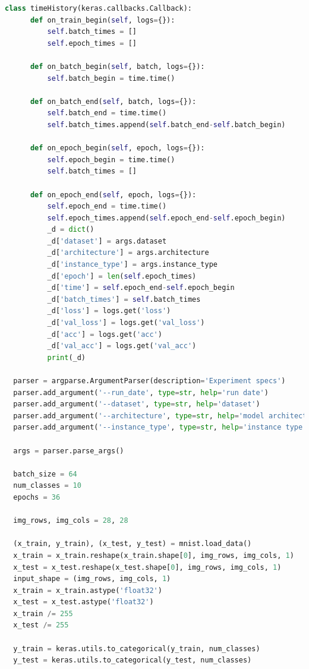 \documentclass[12pt,a4paper,twoside]{article}
\begin{document}
\begin{appendices}
\begin{lstlisting}[language=python]
  class timeHistory(keras.callbacks.Callback):
      def on_train_begin(self, logs={}):
          self.batch_times = []
          self.epoch_times = []

      def on_batch_begin(self, batch, logs={}):
          self.batch_begin = time.time()

      def on_batch_end(self, batch, logs={}):
          self.batch_end = time.time()
          self.batch_times.append(self.batch_end-self.batch_begin)

      def on_epoch_begin(self, epoch, logs={}):
          self.epoch_begin = time.time()
          self.batch_times = []

      def on_epoch_end(self, epoch, logs={}):
          self.epoch_end = time.time()
          self.epoch_times.append(self.epoch_end-self.epoch_begin)
          _d = dict()
          _d['dataset'] = args.dataset
          _d['architecture'] = args.architecture
          _d['instance_type'] = args.instance_type
          _d['epoch'] = len(self.epoch_times)
          _d['time'] = self.epoch_end-self.epoch_begin
          _d['batch_times'] = self.batch_times
          _d['loss'] = logs.get('loss')
          _d['val_loss'] = logs.get('val_loss')
          _d['acc'] = logs.get('acc')
          _d['val_acc'] = logs.get('val_acc')
          print(_d)

  parser = argparse.ArgumentParser(description='Experiment specs')
  parser.add_argument('--run_date', type=str, help='run date')
  parser.add_argument('--dataset', type=str, help='dataset')
  parser.add_argument('--architecture', type=str, help='model architecture')
  parser.add_argument('--instance_type', type=str, help='instance type')

  args = parser.parse_args()

  batch_size = 64
  num_classes = 10
  epochs = 36

  img_rows, img_cols = 28, 28

  (x_train, y_train), (x_test, y_test) = mnist.load_data()
  x_train = x_train.reshape(x_train.shape[0], img_rows, img_cols, 1)
  x_test = x_test.reshape(x_test.shape[0], img_rows, img_cols, 1)
  input_shape = (img_rows, img_cols, 1)
  x_train = x_train.astype('float32')
  x_test = x_test.astype('float32')
  x_train /= 255
  x_test /= 255

  y_train = keras.utils.to_categorical(y_train, num_classes)
  y_test = keras.utils.to_categorical(y_test, num_classes)


\end{lstlisting}
\end{appendices}
\end{document}
